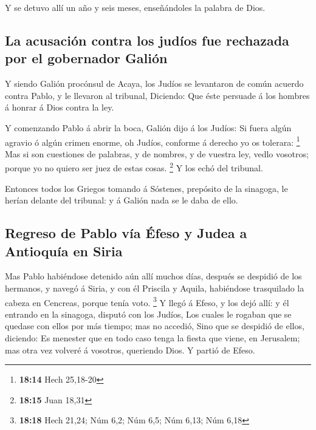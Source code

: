  Y se detuvo allí un año y seis meses, enseñándoles la
palabra de Dios.

\hypertarget{la-acusaciuxf3n-contra-los-juduxedos-fue-rechazada-por-el-gobernador-galiuxf3n}{%
\subsection{La acusación contra los judíos fue rechazada por el
gobernador
Galión}\label{la-acusaciuxf3n-contra-los-juduxedos-fue-rechazada-por-el-gobernador-galiuxf3n}}

 Y siendo Galión procónsul de Acaya, los Judíos se
levantaron de común acuerdo contra Pablo, y le llevaron al tribunal,
 Diciendo: Que éste persuade á los hombres á honrar á Dios
contra la ley.

 Y comenzando Pablo á abrir la boca, Galión dijo á los
Judíos: Si fuera algún agravio ó algún crimen enorme, oh Judíos,
conforme á derecho yo os tolerara: \footnote{\textbf{18:14} Hech
  25,18-20}  Mas si son cuestiones de palabras, y de
nombres, y de vuestra ley, vedlo vosotros; porque yo no quiero ser juez
de estas cosas. \footnote{\textbf{18:15} Juan 18,31}  Y los
echó del tribunal.

 Entonces todos los Griegos tomando á Sóstenes, prepósito
de la sinagoga, le herían delante del tribunal: y á Galión nada se le
daba de ello.

\hypertarget{regreso-de-pablo-vuxeda-uxe9feso-y-judea-a-antioquuxeda-en-siria}{%
\subsection{Regreso de Pablo vía Éfeso y Judea a Antioquía en
Siria}\label{regreso-de-pablo-vuxeda-uxe9feso-y-judea-a-antioquuxeda-en-siria}}

 Mas Pablo habiéndose detenido aún allí muchos días,
después se despidió de los hermanos, y navegó á Siria, y con él Priscila
y Aquila, habiéndose trasquilado la cabeza en Cencreas, porque tenía
voto. \footnote{\textbf{18:18} Hech 21,24; Núm 6,2; Núm 6,5; Núm 6,13;
  Núm 6,18}  Y llegó á Efeso, y los dejó allí: y él
entrando en la sinagoga, disputó con los Judíos,  Los
cuales le rogaban que se quedase con ellos por más tiempo; mas no
accedió,  Sino que se despidió de ellos, diciendo: Es
menester que en todo caso tenga la fiesta que viene, en Jerusalem; mas
otra vez volveré á vosotros, queriendo Dios. Y partió de Efeso.


